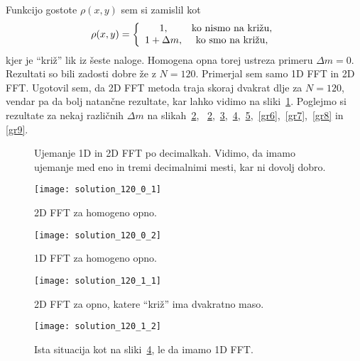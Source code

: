 \documentclass[a4 paper, 12pt]{article}
\begin{document}
Funkcijo gostote $\rho (x,y)$ sem si zamislil kot
\[
    \rho (x,y) = \left\{\begin{array}{c c}
            1, & \text{ko nismo na kri\v zu}, \\
            1 + \Delta m, & \text{ko smo na kri\v zu},
        \end{array}
        \right.
\]
kjer je "`kri\v z"' lik iz \v seste naloge. Homogena opna torej ustreza primeru $\Delta m = 0$.
Rezultati so bili zadosti dobre \v ze z $N = 120$. Primerjal sem samo 1D FFT in 2D FFT. Ugotovil
sem, da 2D FFT metoda traja skoraj dvakrat dlje za $N = 120$, vendar pa da bolj natan\v cne rezultate,
kar lahko vidimo na sliki~\ref{gr1}. Poglejmo si rezultate za nekaj razli\v cnih $\Delta m$ na slikah~\ref{gr2},
~\ref{gr2},~\ref{gr3},~\ref{gr4},~\ref{gr5},~\ref{gr6},~\ref{gr7},~\ref{gr8} in \ref{gr9}.

\begin{figure}[H]\centering
    
    \caption{Ujemanje 1D in 2D FFT po decimalkah. Vidimo, da imamo ujemanje med eno in tremi decimalnimi
        mesti, kar ni dovolj dobro.}
    \label{gr1}
\end{figure}

\begin{figure}[H]\centering
    \texttt{[image: solution\_120\_0\_1]}
    \vspace{-32pt}
    \caption{2D FFT za homogeno opno.}
    \vspace{-18pt}
    \label{gr2}
\end{figure}

\begin{figure}[H]\centering
    \texttt{[image: solution\_120\_0\_2]}
    \vspace{-32pt}
    \caption{1D FFT za homogeno opno.}
    \vspace{-18pt}
    \label{gr3}
\end{figure}

\begin{figure}[H]\centering
    \texttt{[image: solution\_120\_1\_1]}
    \vspace{-32pt}
    \caption{2D FFT za opno, katere "`kri\v z"' ima dvakratno maso.}
    \vspace{-18pt}
    \label{gr4}
\end{figure}

\begin{figure}[H]\centering
    \texttt{[image: solution\_120\_1\_2]}
    \vspace{-32pt}
    \caption{Ista situacija kot na sliki~\ref{gr4}, le da imamo 1D FFT.}
    \vspace{-18pt}
    \label{gr5}
\end{figure}
\end{document}
